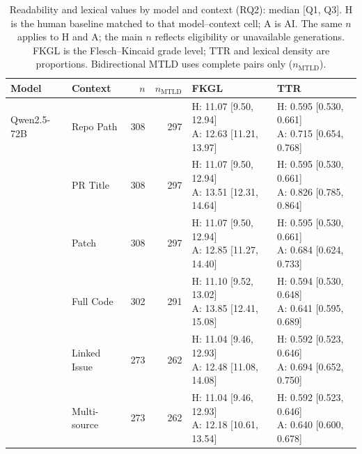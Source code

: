 \begin{table}[tbp]
\centering
\caption{Readability and lexical values by model and context (RQ2): median [Q1, Q3]. H is the human baseline matched to that model--context cell; A is AI. The same $n$ applies to H and A; the main $n$ reflects eligibility or unavailable generations. FKGL is the Flesch--Kincaid grade level; TTR and lexical density are proportions. Bidirectional MTLD uses complete pairs only ($n_{\mathrm{MTLD}}$).}
\label{tab:rq2_feature_descriptives}
\footnotesize
\setlength{\tabcolsep}{3pt}
\renewcommand{\arraystretch}{1.08}
\begin{tabular}{llrrll}
\toprule
\textbf{Model} & \textbf{Context} & \textbf{$n$} & \textbf{$n_{\mathrm{MTLD}}$} & \textbf{FKGL} & \textbf{TTR} \\
\midrule
Qwen2.5-72B & Repo Path & 308 & 297 & \shortstack[l]{H: 11.07 [9.50, 12.94]\\A: 12.63 [11.21, 13.97]} & \shortstack[l]{H: 0.595 [0.530, 0.661]\\A: 0.715 [0.654, 0.768]} \\
 & PR Title & 308 & 297 & \shortstack[l]{H: 11.07 [9.50, 12.94]\\A: 13.51 [12.31, 14.64]} & \shortstack[l]{H: 0.595 [0.530, 0.661]\\A: 0.826 [0.785, 0.864]} \\
 & Patch & 308 & 297 & \shortstack[l]{H: 11.07 [9.50, 12.94]\\A: 12.85 [11.27, 14.40]} & \shortstack[l]{H: 0.595 [0.530, 0.661]\\A: 0.684 [0.624, 0.733]} \\
 & Full Code & 302 & 291 & \shortstack[l]{H: 11.10 [9.52, 13.02]\\A: 13.85 [12.41, 15.08]} & \shortstack[l]{H: 0.594 [0.530, 0.648]\\A: 0.641 [0.595, 0.689]} \\
 & Linked Issue & 273 & 262 & \shortstack[l]{H: 11.04 [9.46, 12.93]\\A: 12.48 [11.08, 14.08]} & \shortstack[l]{H: 0.592 [0.523, 0.646]\\A: 0.694 [0.652, 0.750]} \\
 & Multi-source & 273 & 262 & \shortstack[l]{H: 11.04 [9.46, 12.93]\\A: 12.18 [10.61, 13.54]} & \shortstack[l]{H: 0.592 [0.523, 0.646]\\A: 0.640 [0.600, 0.678]} \\
\midrule

\end{tabular}
\end{table}
